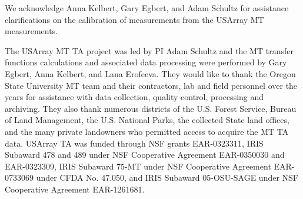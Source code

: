 \documentclass[12pt]{article}
\begin{document}
We acknowledge Anna Kelbert, Gary Egbert, and Adam Schultz for assistance clarifications on the calibration of measurements from the USArray MT measurements.

The USArray MT TA project was led by PI Adam Schultz and the MT transfer functions calculations and associated data processing were performed by Gary Egbert, Anna Kelbert, and Lana Erofeeva.  They would like to thank the Oregon State University MT team and their contractors, lab and field personnel over the years for assistance with data collection, quality control, processing and archiving. They also thank numerous districts of the U.S. Forest Service, Bureau of Land Management, the U.S. National Parks, the collected State land offices, and the many private landowners who permitted access to acquire the MT TA data. USArray TA was funded through NSF grants EAR-0323311, IRIS Subaward 478 and 489 under NSF Cooperative Agreement EAR-0350030 and EAR-0323309, IRIS Subaward 75-MT under NSF Cooperative Agreement EAR-0733069 under CFDA No. 47.050, and IRIS Subaward 05-OSU-SAGE under NSF Cooperative Agreement EAR-1261681.

\clearpage

%


\clearpage

\begin{table}
\hfill
{}
\vspace{1em}
\hfill
{}
\vspace{1em}
  \caption{Summary error statistics based on time series shown in Figures~\ref{figure:UTP17}--\ref{figure:RET54}.  The first and last 18,725~s of the four-day segments were omitted from the calculations.}
\label{table:SummaryStatistics}
\end{table}
\end{document}
